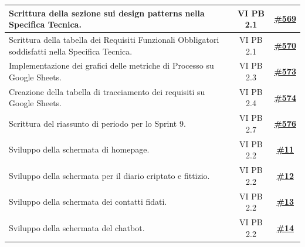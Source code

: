 \documentclass[a4paper,12pt]{article}
\newcommand{\ignoreglossary}{}
\begin{document}
\begin{longtable}{|>{\raggedright\arraybackslash}p{}|c|c|}
\hline
\rowcolor{white}
Scrittura della sezione sui design patterns nella Specifica Tecnica. & VI \ignoreglossary{PB} 2.1 & \href{https://github.com/SWE-BitByBit/SWE-docs/issues/569}{\textbf{\#569}} \\
\hline
\rowcolor{gray!20}
Scrittura della tabella dei Requisiti Funzionali Obbligatori soddisfatti nella Specifica Tecnica. & VI \ignoreglossary{PB} 2.1 & \href{https://github.com/SWE-BitByBit/SWE-docs/issues/570}{\textbf{\#570}} \\
\hline
\rowcolor{white}
Implementazione dei grafici delle metriche di Processo su Google Sheets. & VI \ignoreglossary{PB} 2.3 & \href{https://github.com/SWE-BitByBit/SWE-docs/issues/573}{\textbf{\#573}} \\
\hline
\rowcolor{gray!20}
Creazione della tabella di tracciamento dei requisiti su Google Sheets. & VI \ignoreglossary{PB} 2.4 & \href{https://github.com/SWE-BitByBit/SWE-docs/issues/574}{\textbf{\#574}} \\
\hline
\rowcolor{white}
Scrittura del riassunto di periodo per lo Sprint 9. & VI \ignoreglossary{PB} 2.7 & \href{https://github.com/SWE-BitByBit/SWE-docs/issues/576}{\textbf{\#576}} \\
\hline
\rowcolor{gray!20}
Sviluppo della schermata di homepage. & VI \ignoreglossary{PB} 2.2 & \href{https://github.com/SWE-BitByBit/project-MVP/issues/11}{\textbf{\#11}} \\
\hline
\rowcolor{white}
Sviluppo della schermata per il diario criptato e fittizio. & VI \ignoreglossary{PB} 2.2 & \href{https://github.com/SWE-BitByBit/project-MVP/issues/12}{\textbf{\#12}} \\
\hline
\rowcolor{gray!20}
Sviluppo della schermata dei contatti fidati. & VI \ignoreglossary{PB} 2.2 & \href{https://github.com/SWE-BitByBit/project-MVP/issues/13}{\textbf{\#13}} \\
\hline
\rowcolor{white}
Sviluppo della schermata del chatbot. & VI \ignoreglossary{PB} 2.2 & \href{https://github.com/SWE-BitByBit/project-MVP/issues/14}{\textbf{\#14}} \\
\hline
\end{longtable}
\normalsize
\end{document}
